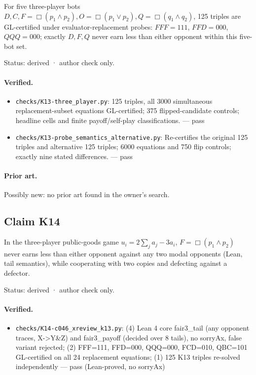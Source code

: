 \documentclass{article}
\begin{document}
For five three-player bots $D,C,F=\Box(p_1\land p_2),O=\Box(p_1\lor p_2),Q=\Box(q_1\land q_2)$, 125 triples are GL-certified under evaluator-replacement probes: $FFF=111$, $FFD=000$, $QQQ=000$; exactly $D,F,Q$ never earn less than either opponent within this five-bot set.

Status: derived · author check only.

\paragraph{Verified.}
\begin{itemize}
\item \texttt{checks/K13-three\_player.py}: 125 triples, all 3000 simultaneous replacement-subset equations GL-certified; 375 flipped-candidate controls; headline cells and finite payoff/self-play classifications. --- pass
\item \texttt{checks/K13-probe\_semantics\_alternative.py}: Re-certifies the original 125 triples and alternative 125 triples; 6000 equations and 750 flip controls; exactly nine stated differences. --- pass
\end{itemize}

\paragraph{Prior art.} Possibly new: no prior art found in the owner's search.

\subsection*{Claim K14}

In the three-player public-goods game $u_i=2\sum_j a_j-3a_i$, $F=\Box(p_1\land p_2)$ never earns less than either opponent against any two modal opponents (Lean, tail semantics), while cooperating with two copies and defecting against a defector.

Status: derived · author check only.

\paragraph{Verified.}
\begin{itemize}
\item \texttt{checks/K14-c046\_xreview\_k13.py}: (4) Lean 4 core fair3\_tail (any opponent traces, X-\textgreater{}Y\&Z) and fair3\_payoff (decided over 8 tails), no sorryAx, false variant rejected; (2) FFF=111, FFD=000, QQQ=000, FCD=010, QBC=101 GL-certified on all 24 replacement equations; (1) 125 K13 triples re-solved independently --- pass (Lean-proved, no sorryAx)
\end{itemize}
\end{document}
